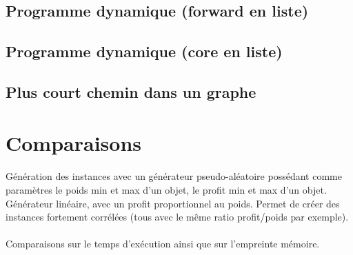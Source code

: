 \documentclass[12pt]{article}
\begin{document}
\paragraph{}

\subsection{Programme dynamique (forward en liste)}

\paragraph{}

\subsection{Programme dynamique (core en liste)}

\paragraph{}

\subsection{Plus court chemin dans un graphe}

\paragraph{}

\section{Comparaisons}

\paragraph{}Génération des instances avec un générateur pseudo-aléatoire possédant comme paramètres le poids min et max d'un objet, le profit min et max d'un objet. Générateur linéaire, avec un profit proportionnel au poids. Permet de créer des instances fortement corrélées (tous avec le même ratio profit/poids par exemple).

\paragraph{}Comparaisons sur le temps d'exécution ainsi que sur l'empreinte mémoire.
\end{document}
